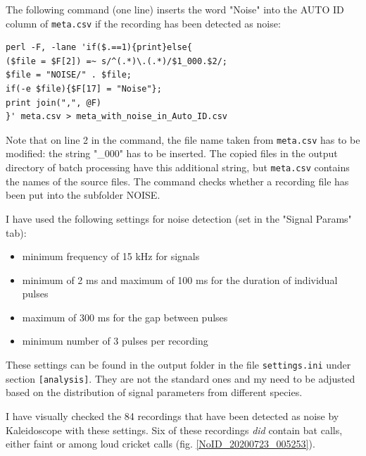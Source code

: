 \documentclass[English, 11pt, twoside, authoryear]{article}
\begin{document}
The following command (one line) inserts the word "Noise" into the AUTO ID column of \texttt{meta.csv} if the recording has been detected as noise:

\begin{lstlisting}
perl -F, -lane 'if($.==1){print}else{
($file = $F[2]) =~ s/^(.*)\.(.*)/$1_000.$2/; 
$file = "NOISE/" . $file; 
if(-e $file){$F[17] = "Noise"}; 
print join(",", @F)
}' meta.csv > meta_with_noise_in_Auto_ID.csv
\end{lstlisting}

Note that on line 2 in the command, the file name taken from \texttt{meta.csv} has to be modified: the string "\_000" has to be inserted. The copied files in the output directory of batch processing have this additional string, but \texttt{meta.csv} contains the names of the source files. The command checks whether a recording file has been put into the subfolder NOISE.

I have used the following settings for noise detection (set in the "Signal Params" tab):
\begin{itemize}
\item minimum frequency of 15 kHz for signals
\item minimum of 2 ms and maximum of 100 ms for the duration of individual pulses
\item maximum of 300 ms for the gap between pulses
\item minimum number of 3 pulses per recording
\end{itemize}

These settings can be found in the output folder in the file \texttt{settings.ini} under section \texttt{[analysis]}. They are not the standard ones and my need to be adjusted based on the distribution of signal parameters from different species.

I have visually checked the 84 recordings that have been detected as noise by Kaleidoscope with these settings. Six of these recordings \emph{did} contain bat calls, either faint or among loud cricket calls (fig. \ref{NoID_20200723_005253}).
\end{document}
